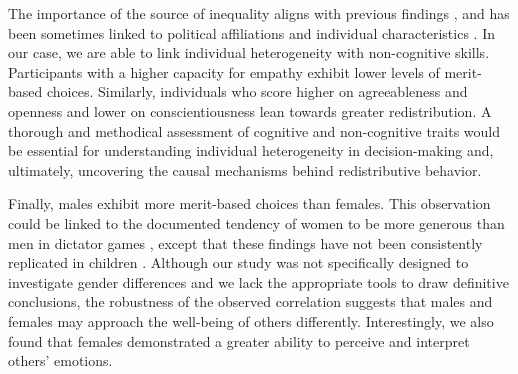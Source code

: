 \documentclass[11pt]{article}
\begin{document}
The importance of the source of inequality aligns with previous findings  \citep{cappelen2010responsibility}, and has been sometimes linked to political affiliations and individual characteristics \citep{alesina2011preferences, luttmer2011culture, almaas2020cutthroat}. In our case, we are able to link individual heterogeneity with non-cognitive skills. Participants with a higher capacity for empathy exhibit lower levels of merit-based choices.
Similarly, individuals who score higher on agreeableness and openness and lower on conscientiousness lean towards greater redistribution. A thorough and methodical assessment of cognitive and non-cognitive traits would be essential for understanding individual heterogeneity in decision-making and, ultimately, uncovering the causal mechanisms behind redistributive behavior.

Finally, males  exhibit more merit-based choices than females. This observation could be linked to the documented tendency of women to be more generous than men in dictator games \citep{eckel1998women, andreoni2001fair, branas2018gender}, except that these findings have not been consistently replicated in children \citep{fehr2013development, brocas2019development, brocas2020development}. 
Although our study was not specifically designed to investigate gender differences and we lack the appropriate tools to draw definitive conclusions, the robustness of the observed correlation suggests that males and females may approach the well-being of others differently. Interestingly, we also found that females demonstrated a greater ability to perceive and interpret others' emotions.

\newpage  
 



 

 
\newpage
\end{document}
